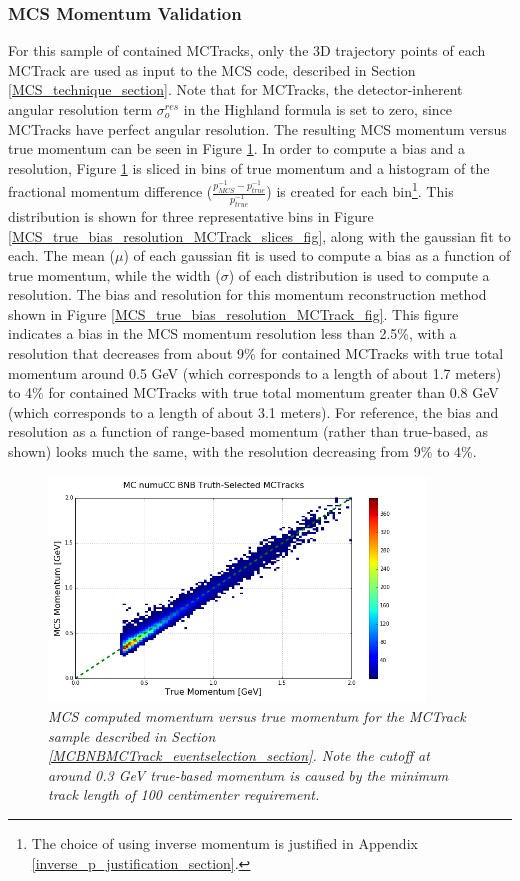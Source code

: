 \subsubsection{MCS Momentum Validation}\label{MCS_Momentum_Validation_MCTrack_section}
For this sample of contained {\sc MCTracks}, only the 3D trajectory points of each {\sc MCTrack} are used as input to the MCS code, described in Section \ref{MCS_technique_section}. Note that for {\sc MCTracks}, the detector-inherent angular resolution term $\sigma_o^{res}$ in the Highland formula is set to zero, since {\sc MCTracks} have perfect angular resolution. The resulting MCS momentum versus true momentum can be seen in Figure \ref{MCS_true_momentum_MCTrack_fig}. In order to compute a bias and a resolution, Figure \ref{MCS_true_momentum_MCTrack_fig} is sliced in bins of true momentum and a histogram of the fractional momentum difference ($\frac{p_{MCS}^{-1} - p_{true}^{-1}}{p_{true}^{-1}}$) is created for each bin\footnote{The choice of using inverse momentum is justified in Appendix \ref{inverse_p_justification_section}.}. This distribution is shown for three representative bins in Figure \ref{MCS_true_bias_resolution_MCTrack_slices_fig}, along with the gaussian fit to each.  The mean ($\mu$) of each gaussian fit is used to compute a bias as a function of true momentum, while the width ($\sigma$) of each distribution is used to compute a resolution. The bias and resolution for this momentum reconstruction method shown in Figure \ref{MCS_true_bias_resolution_MCTrack_fig}. This figure indicates a bias in the MCS momentum resolution less than 2.5\%, with a resolution that decreases from about 9\% for contained {\sc MCTracks} with true total momentum around 0.5 GeV (which corresponds to a length of about 1.7 meters) to 4\% for contained {\sc MCTracks} with true total momentum greater than 0.8 GeV (which corresponds to a length of about 3.1 meters). For reference, the bias and resolution as a function of range-based momentum (rather than true-based, as shown) looks much the same, with the resolution decreasing from 9\% to 4\%.


\begin{figure}[ht!]
\begin{center}
\includegraphics[width=100mm]{Figures/MCS_true_comparison_MCBNBMCTrack.png}
\end{center}
\caption{\textit{MCS computed momentum versus true momentum for the {\sc MCTrack} sample described in Section \ref{MCBNBMCTrack_eventselection_section}. Note the cutoff at around 0.3 GeV true-based momentum is caused by the minimum track length of 100 centimenter requirement.}}
\label{MCS_true_momentum_MCTrack_fig}
\end{figure}


